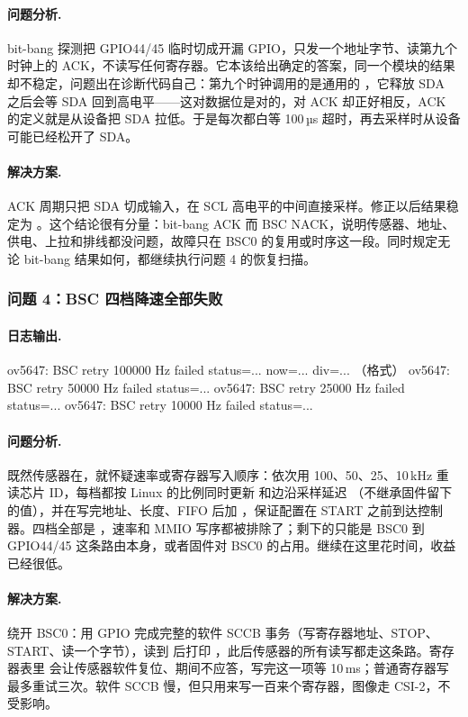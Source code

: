 \paragraph{问题分析.} bit-bang 探测把 GPIO44/45 临时切成开漏 GPIO，只发一个地址字节、读第九个时钟上的 ACK，不读写任何寄存器。它本该给出确定的答案，同一个模块的结果却不稳定，问题出在诊断代码自己：第九个时钟调用的是通用的 ，它释放 SDA 之后会等 SDA 回到高电平——这对数据位是对的，对 ACK 却正好相反，ACK 的定义就是从设备把 SDA 拉低。于是每次都白等 100\,µs 超时，再去采样时从设备可能已经松开了 SDA。

\paragraph{解决方案.} ACK 周期只把 SDA 切成输入，在 SCL 高电平的中间直接采样。修正以后结果稳定为 。这个结论很有分量：bit-bang ACK 而 BSC NACK，说明传感器、地址、供电、上拉和排线都没问题，故障只在 BSC0 的复用或时序这一段。同时规定无论 bit-bang 结果如何，都继续执行问题 4 的恢复扫描。

\subsubsection{问题 4：BSC 四档降速全部失败}

\paragraph{日志输出.}
\begin{txtcode}
ov5647: BSC retry 100000 Hz failed status=... now=... div=...   （格式）
ov5647: BSC retry 50000 Hz failed status=...
ov5647: BSC retry 25000 Hz failed status=...
ov5647: BSC retry 10000 Hz failed status=...
\end{txtcode}

\paragraph{问题分析.} 既然传感器在，就怀疑速率或寄存器写入顺序：依次用 100、50、25、10\,kHz 重读芯片 ID，每档都按 Linux 的比例同时更新  和边沿采样延迟 （不继承固件留下的值），并在写完地址、长度、FIFO 后加 ，保证配置在 START 之前到达控制器。四档全部是 ，速率和 MMIO 写序都被排除了；剩下的只能是 BSC0 到 GPIO44/45 这条路由本身，或者固件对 BSC0 的占用。继续在这里花时间，收益已经很低。

\paragraph{解决方案.} 绕开 BSC0：用 GPIO 完成完整的软件 SCCB 事务（写寄存器地址、STOP、START、读一个字节），读到  后打印 ，此后传感器的所有读写都走这条路。寄存器表里  会让传感器软件复位、期间不应答，写完这一项等 10\,ms；普通寄存器写最多重试三次。软件 SCCB 慢，但只用来写一百来个寄存器，图像走 CSI-2，不受影响。

